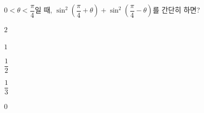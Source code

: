 $0<\theta<\dfrac{\pi}{4}$일 때, $\sin^2\left(\dfrac{\pi}{4}+\theta\right)+\sin^2\left(\dfrac{\pi}{4}-\theta\right)$를 간단히 하면?
\begin{choices32}{\rule[-3ex]{0pt}{8ex}$2$}{\rule[-3ex]{0pt}{8ex}$1$}{\rule[-3ex]{0pt}{8ex}$\dfrac{1}{2}$}{\rule[-3ex]{0pt}{8ex}$\dfrac{1}{3}$}{\rule[-3ex]{0pt}{8ex}$0$}\end{choices32}
